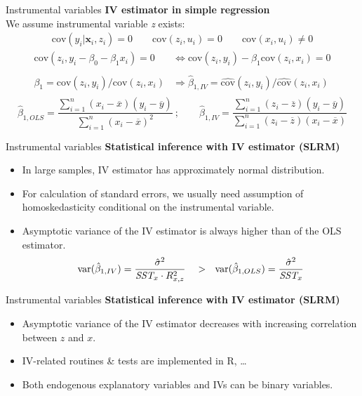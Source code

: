 \documentclass[usenames,dvipsnames]{beamer}
\begin{document}
\begin{frame}{Instrumental variables}
\textbf{IV estimator in simple regression}\\
\medskip
We assume instrumental variable \textit{z} exists:
\begin{align*}
\mathrm{cov}(y_i|\bm{x}_i, z_i) = 0 \qquad \mathrm{cov}(z_i, u_i) = 0 \qquad \mathrm{cov}(x_i, u_i) \neq 0
\end{align*}
\begin{align*}
\mathrm{cov}(z_i,y_i-\beta_0-\beta_1x_i)=0 &\Leftrightarrow \mathrm{cov}(z_i,y_i)-\beta_1 \mathrm{cov}(z_i, x_i)=0\\
\\
\beta_1  = \mathrm{cov}(z_i,y_i)/\mathrm{cov}(z_i, x_i) &\Rightarrow  \hat{\beta}_{1,IV} = \widehat{\mathrm{cov}}(z_i,y_i)/\widehat{\mathrm{cov}}(z_i, x_i)\\
\end{align*}
$$\hat{\beta}_{1,OLS}=\frac{\sum_{i=1}^n(x_i-\overline{x})(y_i-\overline{y})}{\sum_{i=1}^n(x_i-\overline{x})^2}~; \qquad
\hat{\beta}_{1,IV}=\frac{\sum_{i=1}^n(z_i-\overline{z})(y_i-\overline{y})}{\sum_{i=1}^n(z_i-\overline{z})(x_i-\overline{x})}$$
\end{frame}
\begin{frame}{Instrumental variables}
\textbf{Statistical inference with IV estimator (SLRM)}
\begin{itemize}
\item In large samples, IV estimator has approximately normal distribution. 
\item For calculation of standard errors, we usually need assumption of homoskedasticity conditional on the instrumental variable. 
\item Asymptotic variance of the IV estimator is always higher than  of the OLS estimator. 
$$ \textnormal{var}(\hat{\beta}_{1,IV})=\frac{\hat{\sigma}^2}{\textit{SST}_{x} \cdot R^2_{x,z}} ~~~>~~
\textnormal{var}(\hat{\beta}_{1,OLS})=\frac{\hat{\sigma}^2}{\textit{SST}_x}$$
\end{itemize}
\end{frame}
\begin{frame}{Instrumental variables}
\textbf{Statistical inference with IV estimator (SLRM)}\\
\medskip
\begin{itemize}
\item Asymptotic variance of the IV estimator decreases with increasing correlation between $z$ and $x$. 
\item IV-related routines \& tests are implemented in R, \dots 
\item Both endogenous explanatory variables and IVs can be binary variables.
\end{itemize}

\end{frame}
\end{document}
